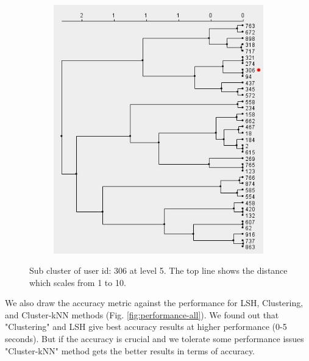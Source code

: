 \documentclass[conference]{IEEEtran}
\begin{document}
\begin{figure}[!h]
        \centering
        \begin{subfigure}[b]{0.50\textwidth}
                \includegraphics[width=\textwidth]{charts/cluster-user-306.jpg}
        \end{subfigure}
        \caption{Sub cluster of user id: 306 at level 5. The top line shows the 
        distance which scales from 1 to 10.}
        \label{fig:sample-user-cluster}
\end{figure}

We also draw the accuracy metric against the performance for LSH, Clustering, 
and Cluster-kNN methods (Fig. \ref{fig:performance-all}). We found out that 
"Clustering" and LSH give best accuracy results at higher performance 
(0-5 seconds). But if the accuracy is crucial and we tolerate some performance 
issues "Cluster-kNN" method gets the better results in terms of accuracy.
\end{document}
